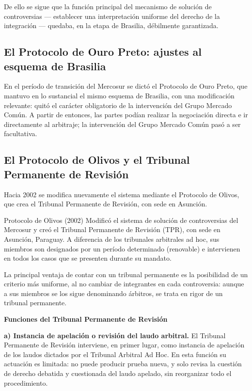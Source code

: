 \documentclass[12pt,oneside]{book}
\begin{document}
De ello se sigue que la función principal del mecanismo de solución de controversias --- establecer una interpretación uniforme del derecho de la integración --- quedaba, en la etapa de Brasilia, débilmente garantizada.

\subsection{El Protocolo de Ouro Preto: ajustes al esquema de Brasilia}

En el período de transición del Mercosur se dictó el Protocolo de Ouro Preto, que mantuvo en lo sustancial el mismo esquema de Brasilia, con una modificación relevante: quitó el carácter obligatorio de la intervención del Grupo Mercado Común. A partir de entonces, las partes podían realizar la negociación directa e ir directamente al arbitraje; la intervención del Grupo Mercado Común pasó a ser facultativa.

\subsection{El Protocolo de Olivos y el Tribunal Permanente de Revisión}

Hacia 2002 se modifica nuevamente el sistema mediante el Protocolo de Olivos, que crea el Tribunal Permanente de Revisión, con sede en Asunción.

\begin{definition}{Protocolo de Olivos (2002)}
Modificó el sistema de solución de controversias del Mercosur y creó el Tribunal Permanente de Revisión (TPR), con sede en Asunción, Paraguay. A diferencia de los tribunales arbitrales ad hoc, sus miembros son designados por un período determinado (renovable) e intervienen en todos los casos que se presenten durante su mandato.
\end{definition}

La principal ventaja de contar con un tribunal permanente es la posibilidad de un criterio más uniforme, al no cambiar de integrantes en cada controversia: aunque a sus miembros se los sigue denominando árbitros, se trata en rigor de un tribunal permanente.

\textbf{Funciones del Tribunal Permanente de Revisión}

\textbf{a) Instancia de apelación o revisión del laudo arbitral.} El Tribunal Permanente de Revisión interviene, en primer lugar, como instancia de apelación de los laudos dictados por el Tribunal Arbitral Ad Hoc. En esta función su actuación es limitada: no puede producir prueba nueva, y solo revisa la cuestión de derecho debatida y cuestionada del laudo apelado, sin reorganizar todo el procedimiento.
\end{document}
